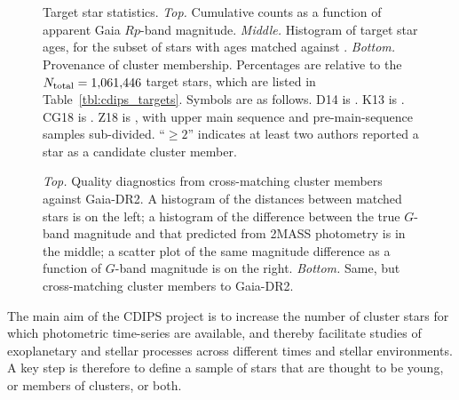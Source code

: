 \documentclass[12pt,twocolumn,tighten,trackchanges]{aastex62}
\begin{document}
\begin{figure}[!t]
	\begin{center}
		\leavevmode
		\vspace{-0.8cm}
		\vspace{-0.8cm}
	\end{center}
	\vspace{-0.8cm}
	\caption{
		Target star statistics.
		{\it Top.} Cumulative counts as a function of apparent Gaia $Rp$-band
		magnitude.  
		{\it Middle.} Histogram of target star ages, for the subset of
		stars with ages matched against \citet{Kharchenko_et_al_2013}.
		{\it Bottom.} Provenance of cluster membership.  Percentages are
		relative to the $N_{\rm total}=1{,}061{,}446$ target stars, which are listed in
		Table~\ref{tbl:cdips_targets}. Symbols
		are as follows.
		D14 is \citet{dias_proper_2014}.
		K13 is \citet{Kharchenko_et_al_2013}.
		CG18 is \citet{cantat-gaudin_gaia_2018}.
		Z18 is \citet{zari_3d_2018}, with upper main sequence and
		pre-main-sequence samples sub-divided.
		``$\geq 2$'' indicates at least two authors reported a star as a
		candidate cluster member.
		\label{fig:cdips_targets}
	}
\end{figure}

\begin{figure}[!t]
	\vspace{-1.1cm}
	\vspace{-0.8cm}
	\caption{
    {\it Top.} Quality diagnostics from cross-matching
    \cite{Kharchenko_et_al_2013} cluster members against Gaia-DR2.  A
    histogram of the distances between matched stars is on the left; a
    histogram of the difference between the true $G$-band magnitude
    and that predicted from 2MASS photometry is in the middle; a
    scatter plot of the same magnitude difference as a function of
    $G$-band magnitude is on the right.
		{\it Bottom.} Same, but cross-matching \cite{dias_proper_2014}
		cluster members to Gaia-DR2.
	}
	\label{fig:xmatch_info}
\end{figure}

The main aim of the CDIPS project is to increase the number of cluster
stars for which photometric time-series are available, and thereby
facilitate studies of exoplanetary and stellar processes across
different times and stellar environments.  A key step is therefore to
define a sample of stars that are thought to be young, or members of
clusters, or both.
\end{document}
